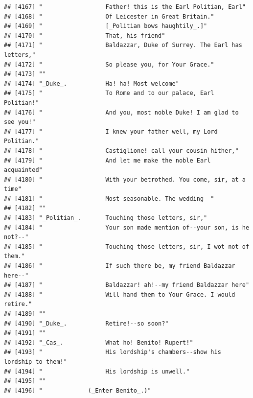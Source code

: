 \documentclass{article}\usepackage[]{graphicx}\usepackage[]{color}
\makeatletter
\newenvironment{kframe}{%
 \def\at@end@of@kframe{}%
 \ifinner\ifhmode%
  \def\at@end@of@kframe{\end{minipage}}%
  \begin{minipage}{\columnwidth}%
 \fi\fi%
 \def\FrameCommand##1{\hskip\@totalleftmargin \hskip-\fboxsep
 \colorbox{shadecolor}{##1}\hskip-\fboxsep
     \hskip-\linewidth \hskip-\@totalleftmargin \hskip\columnwidth}%
 \MakeFramed {\advance\hsize-\width
   \@totalleftmargin\z@ \linewidth\hsize
   \@setminipage}}%
 {\par\unskip\endMakeFramed%
 \at@end@of@kframe}
\newenvironment{knitrout}{}{} %
\makeatother
\begin{document}
\begin{knitrout}
\begin{kframe}
\begin{verbatim}
## [4167] "                  Father! this is the Earl Politian, Earl"                   
## [4168] "                  Of Leicester in Great Britain."                            
## [4169] "                  [_Politian bows haughtily_.]"                              
## [4170] "                  That, his friend"                                          
## [4171] "                  Baldazzar, Duke of Surrey. The Earl has letters,"          
## [4172] "                  So please you, for Your Grace."                            
## [4173] ""                                                                            
## [4174] "_Duke_.           Ha! ha! Most welcome"                                      
## [4175] "                  To Rome and to our palace, Earl Politian!"                 
## [4176] "                  And you, most noble Duke! I am glad to see you!"           
## [4177] "                  I knew your father well, my Lord Politian."                
## [4178] "                  Castiglione! call your cousin hither,"                     
## [4179] "                  And let me make the noble Earl acquainted"                 
## [4180] "                  With your betrothed. You come, sir, at a time"             
## [4181] "                  Most seasonable. The wedding--"                            
## [4182] ""                                                                            
## [4183] "_Politian_.       Touching those letters, sir,"                              
## [4184] "                  Your son made mention of--your son, is he not?--"          
## [4185] "                  Touching those letters, sir, I wot not of them."           
## [4186] "                  If such there be, my friend Baldazzar here--"              
## [4187] "                  Baldazzar! ah!--my friend Baldazzar here"                  
## [4188] "                  Will hand them to Your Grace. I would retire."             
## [4189] ""                                                                            
## [4190] "_Duke_.           Retire!--so soon?"                                         
## [4191] ""                                                                            
## [4192] "_Cas_.            What ho! Benito! Rupert!"                                  
## [4193] "                  His lordship's chambers--show his lordship to them!"       
## [4194] "                  His lordship is unwell."                                   
## [4195] ""                                                                            
## [4196] "             (_Enter Benito_.)"                                              

\end{verbatim}
\end{kframe}
\end{knitrout}
\end{document}
